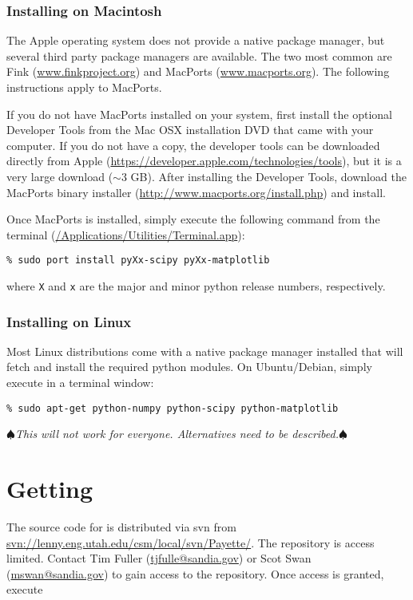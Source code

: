 \documentclass[11pt]{article}
\newcommand{\payette}{{\sc{Payette}}}
\newcommand{\termcommand}[1]{\indent\hspace{.2in}\texttt{\% #1}\newline}
\newcommand{\AuthorMark}{$\spadesuit$}
\newcommand{\AuthorNote}[1]{{%
      \marginpar{$\longleftarrow$}
      \raggedright\footnotesize
      \itshape\smallskip\AuthorMark#1\AuthorMark\smallskip
}}%
\begin{document}
\subsubsection{Installing on Macintosh}
The Apple operating system does not provide a native package manager, but several
third party package managers are available.  The two most common are Fink
(\url{www.finkproject.org}) and MacPorts (\url{www.macports.org}).  The following
instructions apply to MacPorts.

If you do not have MacPorts installed on your system, first install the optional
Developer Tools from the Mac OSX installation DVD that came with your computer.
If you do not have a copy, the developer tools can be downloaded directly from
Apple (\url{https://developer.apple.com/technologies/tools}), but it is a very
large download ($\sim$3 GB).  After installing the Developer Tools, download the
MacPorts binary installer (\url{http://www.macports.org/install.php}) and
install.

Once MacPorts is installed, simply execute the following command from the
terminal (\url{/Applications/Utilities/Terminal.app}): \newline

\termcommand{sudo port install pyXx-scipy pyXx-matplotlib}

\noindent where \texttt{X} and \texttt{x} are the major and minor python release
numbers, respectively.

\subsubsection{Installing on Linux}
Most Linux distributions come with a native package manager installed that will
fetch and install the required python modules.  On Ubuntu/Debian, simply execute
in a terminal window:\newline

\termcommand{sudo apt-get python-numpy python-scipy python-matplotlib}
\AuthorNote{This will not work for everyone. Alternatives need to be described.}

\section{Getting \payette{}}
\label{sec:getting}
The source code for \payette{} is distributed via svn from
\url{svn://lenny.eng.utah.edu/csm/local/svn/Payette/}.  The repository is access
limited.  Contact Tim Fuller (\url{tjfulle@sandia.gov}) or Scot Swan
(\url{mswan@sandia.gov}) to gain access to the repository.  Once access is
granted, execute \newline
\end{document}
